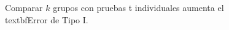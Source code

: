 \documentclass[preview]{standalone}
\begin{document}
\begin{center}
Comparar $k$ grupos con pruebas t individuales aumenta el \\textbf{Error de Tipo I}.
\end{center}
\end{document}
